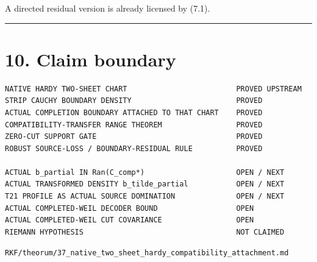 A directed residual version is already licensed by (7.1).

\begin{center}\rule{0.5\linewidth}{0.5pt}\end{center}

\hypertarget{claim-boundary}{%
\section{10. Claim boundary}\label{claim-boundary}}

\begin{verbatim}
NATIVE HARDY TWO-SHEET CHART                         PROVED UPSTREAM
STRIP CAUCHY BOUNDARY DENSITY                        PROVED
ACTUAL COMPLETION BOUNDARY ATTACHED TO THAT CHART    PROVED
COMPATIBILITY-TRANSFER RANGE THEOREM                 PROVED
ZERO-CUT SUPPORT GATE                                PROVED
ROBUST SOURCE-LOSS / BOUNDARY-RESIDUAL RULE          PROVED

ACTUAL b_partial IN Ran(C_comp*)                     OPEN / NEXT
ACTUAL TRANSFORMED DENSITY b_tilde_partial           OPEN / NEXT
T21 PROFILE AS ACTUAL SOURCE DOMINATION              OPEN / NEXT
ACTUAL COMPLETED-WEIL DECODER BOUND                  OPEN
ACTUAL COMPLETED-WEIL CUT COVARIANCE                 OPEN
RIEMANN HYPOTHESIS                                   NOT CLAIMED
\end{verbatim}

\begin{flushright}\small\texttt{RKF/theorum/37\_native\_two\_sheet\_hardy\_compatibility\_attachment.md}\end{flushright}
